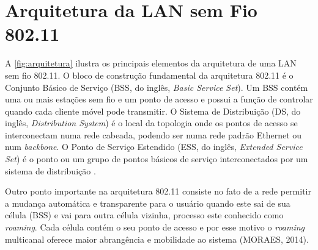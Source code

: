 \section{Arquitetura da LAN sem Fio 802.11}
\label{arquitetura-802-11}

A \autoref{fig:arquitetura} ilustra os principais elementos da arquitetura de uma LAN sem fio 802.11. O bloco de construção fundamental da arquitetura 802.11 é o Conjunto Básico de Serviço (BSS, do inglês, \textit{Basic Service Set}). Um BSS contém uma ou mais estações sem fio e um ponto de acesso e possui a função de controlar quando cada cliente móvel pode transmitir. O Sistema de Distribuição (DS, do inglês, \textit{Distribution System}) é o local da topologia onde os pontos de acesso se interconectam numa rede cabeada, podendo ser numa rede padrão Ethernet ou num \textit{backbone}. O Ponto de Serviço Estendido (ESS, do inglês, \textit{Extended Service Set}) é o ponto ou um grupo de pontos básicos de serviço interconectados por um sistema de distribuição \cite{moraes2010}.

\begin{figure}[H]
	\centering
\end{figure}

Outro ponto importante na arquitetura 802.11 consiste no fato de a rede permitir a mudança automática e transparente para o usuário quando este sai de sua célula (BSS) e vai para outra célula vizinha, processo este conhecido como \textit{roaming}. Cada célula contém o seu ponto de acesso e por esse motivo o \textit{roaming} multicanal oferece maior abrangência e mobilidade ao sistema (MORAES, 2014).

